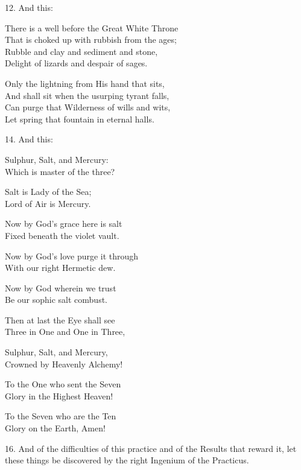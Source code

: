 12. And this:
\begin{tightverse}
 There is a well before the Great White Throne \\
That is choked up with rubbish from the ages; \\
Rubble and clay and sediment and stone, \\
Delight of lizards and despair of sages.

Only the lightning from His hand that sits, \\
And shall sit when the usurping tyrant falls, \\
Can purge that Wilderness of wills and wits, \\
Let spring that fountain in eternal halls. \\
\end{tightverse}

14. And this:
\begin{tightverse}
 Sulphur, Salt, and Mercury: \\
 Which is master of the three?

 Salt is Lady of the Sea; \\
 Lord of Air is Mercury.

 Now by God's grace here is salt \\
 Fixed beneath the violet vault.

 Now by God's love purge it through \\
 With our right Hermetic dew.

 Now by God wherein we trust \\
 Be our sophic salt combust.

 Then at last the Eye shall see \\
 Three in One and One in Three,

 Sulphur, Salt, and Mercury, \\
 Crowned by Heavenly Alchemy!

 To the One who sent the Seven \\
 Glory in the Highest Heaven!

 To the Seven who are the Ten \\
 Glory on the Earth, Amen!
\end{tightverse}

16. And of the difficulties of this practice and of the Results that reward it, let these things be discovered by the right Ingenium of the Practicus.
